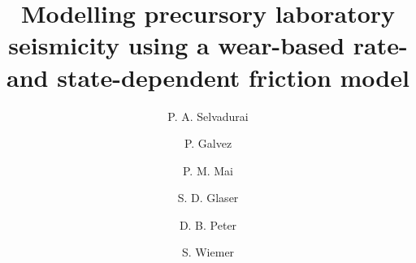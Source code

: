 \documentclass[final,3p, 11pt,authoryear]{elsarticle}
\begin{document}
\begin{frontmatter}



\title{Modelling precursory laboratory seismicity using a wear-based rate- and state-dependent friction model}

 \author[1]{P. A. Selvadurai }
\author[2]{P. Galvez}
\author[2]{P. M. Mai}
\author[3]{S. D. Glaser} 
\author[2]{D. B. Peter}
\author[1]{S. Wiemer} 



\address[1]{Swiss Seismological Service, ETH Zurich, Zurich, Switzerland}
\address[2]{King Abdullah University of Science and Technology, Thuwal, Saudi Arabia}
\address[3]{Civil and Environmental Engineering, University of California, Berkeley, California, USA}



\begin{abstract}




\end{abstract}
\end{frontmatter}
\end{document}
